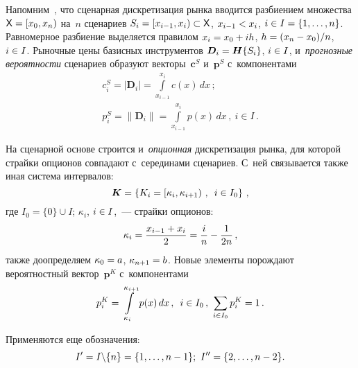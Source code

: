 \begin{multicols}{2}
  Напомним~\cite{2-aga, 4-aga}, что сценарная дискретизация рынка вводится 
разбиением множества ${\sf X}\hm= [x_0, x_n)$ на~$n$ сценариев $S_i\hm= 
[x_{i-1}, x_i)\hm\subset {\sf X}$, $x_{i-1}\hm< x_i$, $i\hm\in I \hm= \{1, \ldots, n\}$. 
Равномерное разбиение выделяется правилом $x_i\hm = x_0 \hm+ ih$, $h \hm= 
(x_n \hm- x_0)/n$, $i\hm\in I$. Рыночные цены базисных инструментов 
$\boldsymbol{D}_i \hm= \boldsymbol{H}\{S_i\}$, $i\hm\in I$, и~\textit{прогнозные 
вероятности} сценариев образуют векторы~$\boldsymbol{c}^S$ 
и~$\boldsymbol{p}^S$ с~компонентами 
  \begin{multline}
  c_i^S=\left\vert \boldsymbol{D}_i\right\vert =\int\limits_{x_{i-1}}^{x_i} 
c(x)\,dx\,;\\
p_i^S=\left\| \boldsymbol{D}_i \right\| =
\int\limits_{x_{i-1}}^{x_i} p(x)\,dx\,,\ i\in I\,.
  \label{e4-aga}
  \end{multline}
  
  На сценарной основе  строится и~\textit{опционная} дискретизация рынка, для 
которой страйки опционов совпадают с~серединами сценариев. С~ней 
связывается также иная система интервалов: 
  \begin{equation}
   \boldsymbol{K}=\left\{ 
    K_i=\left[ \kappa_i,\kappa_{i+1}\right)\,,\enskip
  i\in I_0\right\}\,,
  \label{e5-aga}
  \end{equation}
где $I_0=\{0\}\cup I$; $\kappa_i$, $i\hm\in I$,~--- страйки опционов:
      \begin{equation*}
   \kappa_i=\fr{x_{i-1}+x_i}{2} =\fr{i}{n}-\fr{1}{2n}\,, %
     \end{equation*}
 также 
доопределяем $\kappa_0\hm=a$, $\kappa_{n+1}\hm= b$. Новые элементы 
порождают вероятностный вектор~$\boldsymbol{p}^K$ с~компонентами 
\begin{equation}
p_i^K =\int\limits_{\kappa_i}^{\kappa_{i+1}} p (x)\,dx\,,\enskip i\in I_0\,,\ 
\sum\limits_{i\in I_0} p_i^K=1\,.
\label{e6-aga}
\end{equation}
  
  Применяются еще обозначения:
  $$
  I^\prime = I\backslash \{n\} = \{1, 
\ldots , n-1\};\ I^{\prime\prime}= \{2, \ldots , n\hm-2\}.
$$ 
  

\end{multicols}
